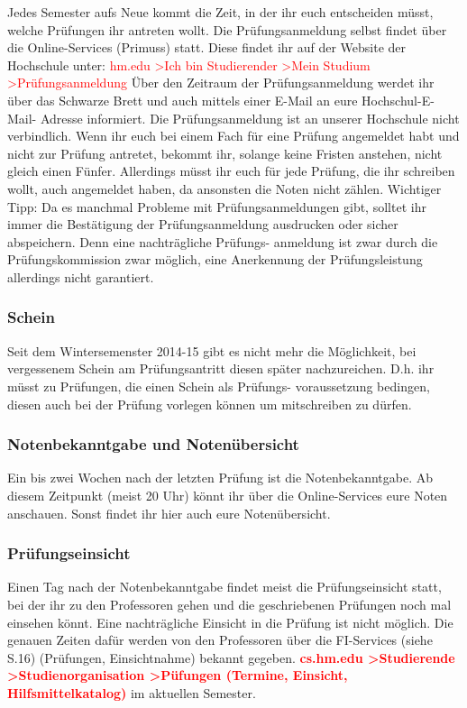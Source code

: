 Jedes Semester aufs Neue kommt die Zeit, in der ihr euch entscheiden müsst, welche Prüfungen ihr antreten wollt.\doublebreak
Die Prüfungsanmeldung selbst findet über die Online-Services (Primuss) statt. Diese findet ihr auf der Website der Hochschule unter:\doublebreak
\textcolor{red}{hm.edu \textgreater Ich bin Studierender \textgreater Mein Studium \textgreater Prüfungsanmeldung}\doublebreak
Über den Zeitraum der Prüfungsanmeldung werdet ihr über das Schwarze Brett und auch mittels einer E-Mail an eure Hochschul-E-Mail- Adresse informiert.\doublebreak
Die Prüfungsanmeldung ist an unserer Hochschule nicht verbindlich. Wenn ihr euch bei einem Fach für eine Prüfung angemeldet habt und nicht zur Prüfung antretet, bekommt ihr, solange keine Fristen anstehen, nicht gleich einen Fünfer. Allerdings müsst ihr euch für jede Prüfung, die ihr schreiben wollt, auch angemeldet haben, da ansonsten die Noten nicht zählen.\doublebreak 
Wichtiger Tipp: Da es manchmal Probleme mit Prüfungsanmeldungen gibt, solltet ihr immer die Bestätigung der Prüfungsanmeldung ausdrucken oder sicher abspeichern. Denn eine nachträgliche Prüfungs- anmeldung ist zwar durch die Prüfungskommission zwar möglich, eine Anerkennung der Prüfungsleistung allerdings nicht garantiert.

\subsubsection{Schein}
Seit dem Wintersemenster 2014-15 gibt es nicht mehr die Möglichkeit, bei vergessenem Schein am Prüfungsantritt diesen später nachzureichen. D.h. ihr müsst zu Prüfungen, die einen Schein als Prüfungs- voraussetzung bedingen, diesen auch bei der Prüfung vorlegen können um mitschreiben zu dürfen.

\subsubsection{Notenbekanntgabe und Notenübersicht}

Ein bis zwei Wochen nach der letzten Prüfung ist die Notenbekanntgabe. Ab diesem Zeitpunkt (meist 20 Uhr) könnt ihr über die Online-Services eure Noten anschauen. Sonst findet ihr hier auch eure Notenübersicht.

\subsubsection{Prüfungseinsicht}

Einen Tag nach der Notenbekanntgabe findet meist die Prüfungseinsicht statt, bei der ihr zu den Professoren gehen und die geschriebenen Prüfungen noch mal einsehen könnt. Eine nachträgliche Einsicht in die Prüfung ist nicht möglich. Die genauen Zeiten dafür werden von den Professoren über die FI-Services (siehe S.16) (Prüfungen, Einsichtnahme) bekannt gegeben.\doublebreak
\textcolor{red}{\textbf{cs.hm.edu \textgreater Studierende \textgreater Studienorganisation \textgreater Püfungen (Termine, Einsicht, Hilfsmittelkatalog)}} im aktuellen Semester.


